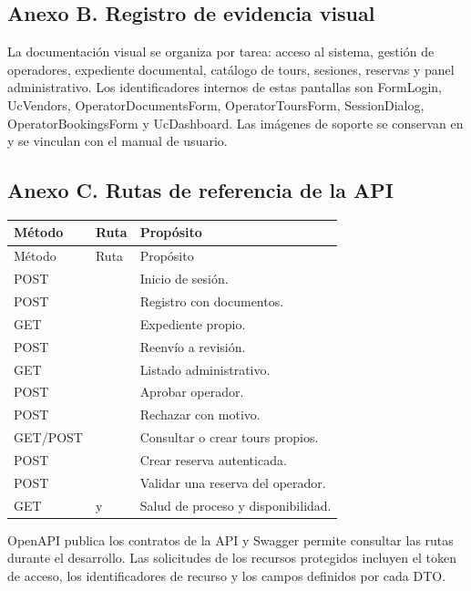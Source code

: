 \subsection*{Anexo B. Registro de evidencia visual}
La documentación visual se organiza por tarea: acceso al sistema, gestión de operadores, expediente documental, catálogo de tours, sesiones, reservas y panel administrativo. Los identificadores internos de estas pantallas son FormLogin, UcVendors, OperatorDocumentsForm, OperatorToursForm, SessionDialog, OperatorBookingsForm y UcDashboard. Las imágenes de soporte se conservan en  y se vinculan con el manual de usuario.

\subsection*{Anexo C. Rutas de referencia de la API}
\begin{longtable}{@{}P{2.35cm}P{7.1cm}P{3.8cm}@{}}
\toprule Método & Ruta & Propósito \\ \midrule\endfirsthead
\toprule Método & Ruta & Propósito \\ \midrule\endhead
POST &  & Inicio de sesión. \\
POST &  & Registro con documentos. \\
GET &  & Expediente propio. \\
POST &  & Reenvío a revisión. \\
GET &  & Listado administrativo. \\
POST &  & Aprobar operador. \\
POST &  & Rechazar con motivo. \\
GET/POST &  & Consultar o crear tours propios. \\
POST &  & Crear reserva autenticada. \\
POST &  & Validar una reserva del operador. \\
GET &  y  & Salud de proceso y disponibilidad. \\
\bottomrule
\end{longtable}
OpenAPI publica los contratos de la API y Swagger permite consultar las rutas durante el desarrollo. Las solicitudes de los recursos protegidos incluyen el token de acceso, los identificadores de recurso y los campos definidos por cada DTO.

